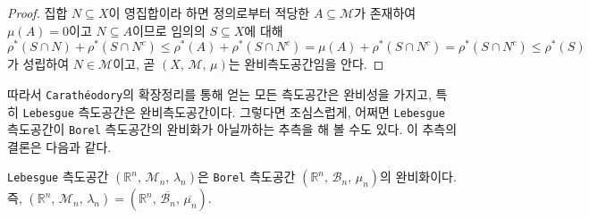 \begin{proof}
    집합 $N\subseteq X$이 영집합이라 하면 정의로부터 적당한 $A\subseteq\mathcal{M}$가 존재하여 $\mu(A)=0$이고 $N\subseteq A$이므로 임의의 $S\subseteq X$에 대해 $\rho^*(S\cap N)+\rho^*(S\cap N^c)\leq\rho^*(A)+\rho^*(S\cap N^c)=\mu(A)+\rho^*(S\cap N^c)=\rho^*(S\cap N^c)\leq\rho^*(S)$가 성립하여 $N\in\mathcal{M}$이고, 곧 $(X,\,\mathcal{M},\,\mu)$는 완비측도공간임을 안다.
\end{proof}

따라서 \texttt{Carath\'eodory}의 확장정리를 통해 얻는 모든 측도공간은 완비성을 가지고, 특히 \texttt{Lebesgue} 측도공간은 완비측도공간이다. 그렇다면 조심스럽게, 어쩌면 \texttt{Lebesgue} 측도공간이 \texttt{Borel} 측도공간의 완비화가 아닐까하는 추측을 해 볼 수도 있다. 이 추측의 결론은 다음과 같다.

\begin{theorem}\label{thm:LebesgueComplete}
    \texttt{Lebesgue} 측도공간 $(\mathbb{R}^n,\,\mathcal{M}_n,\,\lambda_n)$은 \texttt{Borel} 측도공간 $(\mathbb{R}^n,\,\mathcal{B}_n,\,\mu_n)$의 완비화이다. 즉, $(\mathbb{R}^n,\,\mathcal{M}_n,\,\lambda_n)=(\mathbb{R}^n,\,\overline{\mathcal{B}_n},\,\overline{\mu_n})$.
\end{theorem}

